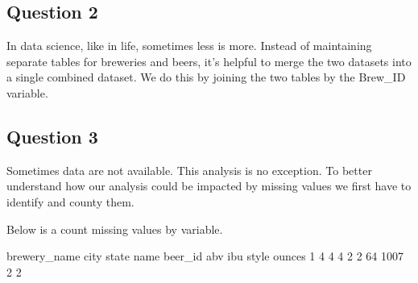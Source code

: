 \documentclass[]{article}
\newenvironment{Shaded}{\begin{snugshade}}{\end{snugshade}}
\newcommand{\KeywordTok}[1]{\textcolor[rgb]{0.13,0.29,0.53}{\textbf{#1}}}
\newcommand{\DataTypeTok}[1]{\textcolor[rgb]{0.13,0.29,0.53}{#1}}
\newcommand{\StringTok}[1]{\textcolor[rgb]{0.31,0.60,0.02}{#1}}
\newcommand{\CommentTok}[1]{\textcolor[rgb]{0.56,0.35,0.01}{\textit{#1}}}
\newcommand{\ControlFlowTok}[1]{\textcolor[rgb]{0.13,0.29,0.53}{\textbf{#1}}}
\newcommand{\OperatorTok}[1]{\textcolor[rgb]{0.81,0.36,0.00}{\textbf{#1}}}
\newcommand{\NormalTok}[1]{#1}
\begin{document}
\subsection{Question 2}\label{question-2}

In data science, like in life, sometimes less is more. Instead of
maintaining separate tables for breweries and beers, it's helpful to
merge the two datasets into a single combined dataset. We do this by
joining the two tables by the Brew\_ID variable.

\begin{Shaded}
\end{Shaded}

\subsection{Question 3}\label{question-3}

Sometimes data are not available. This analysis is no exception. To
better understand how our analysis could be impacted by missing values
we first have to identify and county them.

Below is a count missing values by variable.

\begin{Shaded}
\end{Shaded}

brewery\_name city state name beer\_id abv ibu style ounces 1 4 4 4 2 2
64 1007 2 2

\begin{Shaded}
\end{Shaded}
\end{document}

